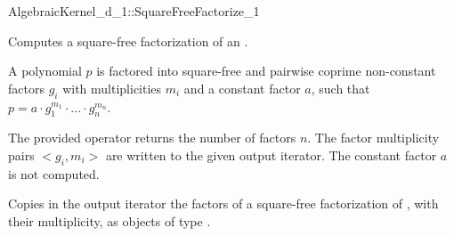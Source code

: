 \begin{ccRefFunctionObjectConcept}{AlgebraicKernel_d_1::SquareFreeFactorize_1}

\ccDefinition
Computes a square-free factorization of an
.

A polynomial $p$ is factored into square-free and pairwise 
coprime non-constant factors $g_i$ with multiplicities $m_i$ 
and a constant factor $a$, such that 
$p = a  \cdot  g_1^{m_1}  \cdot  ...  \cdot  g_n^{m_n}$.

The provided operator returns the number of factors $n$.
The factor multiplicity pairs $<g_i,m_i>$ are written to the 
given output iterator. The constant factor $a$ is not computed. 

\ccRefines 
{} 

\ccTypes
{}
\ccGlue
{}

\ccOperations
{}

{Copies in the output iterator the factors of a square-free 
factorization of , with their multiplicity, as objects of type 
.}

\ccSeeAlso
{}\\
\\

\end{ccRefFunctionObjectConcept}
